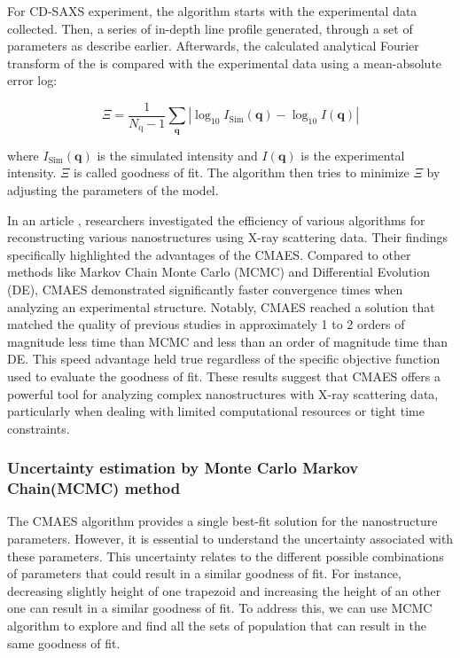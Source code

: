 \FloatBarrier

\medskip

For CD-SAXS experiment, the algorithm starts with the experimental data collected. Then, a series of in-depth line profile generated, through a set of parameters as describe earlier. 
Afterwards, the calculated analytical Fourier transform of the is compared with the experimental data using a mean-absolute error log:

\medskip

\begin{equation}
    \Xi=\frac{1}{N_{\mathrm{q}}-1} \sum_{\mathbf{q}}\left|\log _{10} I_{\mathrm{Sim}}(\mathbf{q})-\log _{10} I(\mathbf{q})\right|
\end{equation}

\medskip

where $I_{\mathrm{Sim}}(\mathbf{q})$ is the simulated intensity and $I(\mathbf{q})$ is the experimental intensity.
$\Xi$ is called goodness of fit. The algorithm then tries to minimize $\Xi$ by adjusting the parameters of the model.

\medskip

In an article \cite{hannon2016advancing}, researchers investigated the efficiency of various algorithms
for reconstructing various nanostructures using X-ray scattering data.
Their findings specifically highlighted the advantages of the CMAES. Compared to other
methods like Markov Chain Monte Carlo (MCMC) and Differential Evolution 
(DE), CMAES demonstrated significantly faster convergence times when 
analyzing an experimental structure. Notably, CMAES reached a solution 
that matched the quality of previous studies in approximately 1 to 2 
orders of magnitude less time than MCMC and less than an order of 
magnitude time than DE. This speed advantage held true regardless 
of the specific objective function used to evaluate the goodness of fit. 
These results suggest that CMAES offers a powerful tool for analyzing 
complex nanostructures with X-ray scattering data, particularly when 
dealing with limited computational resources or tight time constraints.

\subsubsection{Uncertainty estimation by Monte Carlo Markov Chain(MCMC) method}\label{sec:mcmc_cdsaxs}

The CMAES algorithm provides a single best-fit solution for the nanostructure parameters. However, it is essential to understand the uncertainty associated with these parameters.
This uncertainty relates to the different possible combinations of parameters that could result in a similar goodness of fit. 
For instance, decreasing slightly height of one trapezoid and increasing the height of an other one can result in a similar goodness of fit.
To address this, we can use MCMC algorithm to explore and find all the sets of population that can result in the same goodness of fit.

